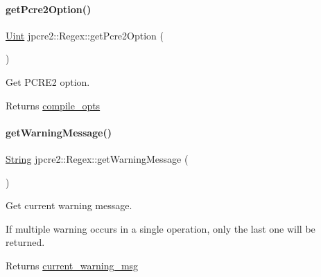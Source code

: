 \paragraph{\texorpdfstring{get\+Pcre2\+Option()}{getPcre2Option()}}
{\footnotesize\ttfamily \hyperlink{namespacejpcre2_a078242d38221a13fb3543b9edd78c099}{Uint} jpcre2\+::\+Regex\+::get\+Pcre2\+Option (\begin{DoxyParamCaption}{ }\end{DoxyParamCaption})\hspace{0.3cm}{\ttfamily [inline]}}



Get P\+C\+R\+E2 option. 

\begin{DoxyReturn}{Returns}
\hyperlink{classjpcre2_1_1Regex_a5954131e9085de63229ed5c11417df69}{compile\+\_\+opts} 
\end{DoxyReturn}
\hypertarget{classjpcre2_1_1Regex_a1a639ae4090b88609c03e9268faf02d8_a1a639ae4090b88609c03e9268faf02d8}{}\label{classjpcre2_1_1Regex_a1a639ae4090b88609c03e9268faf02d8_a1a639ae4090b88609c03e9268faf02d8} 
\paragraph{\texorpdfstring{get\+Warning\+Message()}{getWarningMessage()}}
{\footnotesize\ttfamily \hyperlink{namespacejpcre2_a91f03070152fb228bc116c5a737f1d16}{String} jpcre2\+::\+Regex\+::get\+Warning\+Message (\begin{DoxyParamCaption}{ }\end{DoxyParamCaption})\hspace{0.3cm}{\ttfamily [inline]}}



Get current warning message. 

If multiple warning occurs in a single operation, only the last one will be returned. \begin{DoxyReturn}{Returns}
\hyperlink{classjpcre2_1_1Regex_a1cfacd49c8bceaae1e2a66efd4082ea8}{current\+\_\+warning\+\_\+msg} 
\end{DoxyReturn}
\hypertarget{classjpcre2_1_1Regex_a6df564d3dec70bbeec65de125c7d4de2_a6df564d3dec70bbeec65de125c7d4de2}{}\label{classjpcre2_1_1Regex_a6df564d3dec70bbeec65de125c7d4de2_a6df564d3dec70bbeec65de125c7d4de2} 
